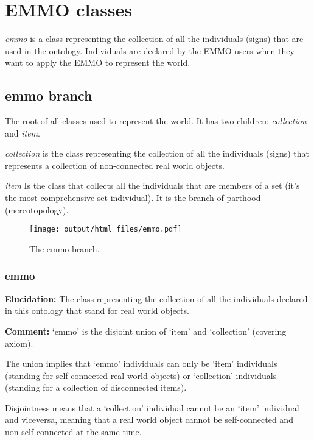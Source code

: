 \documentclass[a4paper,]{report}
\begin{document}
\hypertarget{emmo-classes}{%
\chapter{EMMO classes}\label{emmo-classes}}

\emph{emmo} is a class representing the collection of all the
individuals (signs) that are used in the ontology. Individuals are
declared by the EMMO users when they want to apply the EMMO to represent
the world.

\hypertarget{emmo-branch}{%
\section{emmo branch}\label{emmo-branch}}

The root of all classes used to represent the world. It has two
children; \emph{collection} and \emph{item}.

\emph{collection} is the class representing the collection of all the
individuals (signs) that represents a collection of non-connected real
world objects.

\emph{item} Is the class that collects all the individuals that are
members of a set (it's the most comprehensive set individual). It is the
branch of parthood (mereotopology).

\begin{figure}
\centering
\texttt{[image: output/html\_files/emmo.pdf]}
\caption{The emmo branch.}
\end{figure}

\hypertarget{emmo}{%
\subsection{emmo}\label{emmo}}

\textbf{Elucidation:} The class representing the collection of all the
individuals declared in this ontology that stand for real world objects.

\textbf{Comment:} `emmo' is the disjoint union of `item' and
`collection' (covering axiom).

The union implies that `emmo' individuals can only be `item' individuals
(standing for self-connected real world objects) or `collection'
individuals (standing for a collection of disconnected items).

Disjointness means that a `collection' individual cannot be an `item'
individual and viceversa, meaning that a real world object cannot be
self-connected and non-self connected at the same time.
\end{document}
